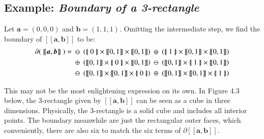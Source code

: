 \subsection{Example: \emph{Boundary of a 3-rectangle}}
Let $\boldsymbol{a} = (0,0,0)$ and $\boldsymbol{b} = (1,1,1)$.
Omitting the intermediate step, we find the boundary of $[\![ \boldsymbol{a}, \boldsymbol{b} ]\!]$ to be:
\begin{align*}
	\partial ( \; [\![ \boldsymbol{a} , \boldsymbol{b} ]\!] \; ) =
	& 	\; \ominus \; \left( \hset{0} \times [\![0,1]\!] \times [\![0,1]\!] \right)
		\; \oplus \; \left( \hset{1} \times [\![0,1]\!] \times [\![0,1]\!] \right)
	\\& 	\; \oplus \; \left( [\![0,1]\!] \times \hset{0} \times [\![0,1]\!] \right)
	 	\; \ominus \; \left( [\![0,1]\!] \times \hset{1} \times [\![0,1]\!] \right)
	\\& 	\; \ominus \; \left( [\![0,1]\!] \times [\![0,1]\!] \times \hset{0} \right)
	  	\; \oplus \; \left( [\![0,1]\!] \times [\![0,1]\!] \times \hset{1} \right)
\end{align*}

This may not be the most enlightening expression on its own.
In Figure 4.3 below, the 3-rectangle given by $[\![\boldsymbol{a}, \boldsymbol{b}]\!]$ can be seen as a cube in three dimensions.
Physically, the 3-rectangle is a solid cube and includes all interior points.
The boundary meanwhile are just the rectangular outer faces, which conveniently,
 there are also six to match the six terms of $\partial[\![\boldsymbol{a},\boldsymbol{b}]\!]$.


